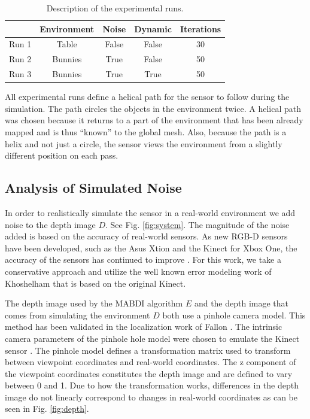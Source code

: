 \begin{table}[h]
  \caption{Description of the experimental runs.}
  \label{tab:run}
  \begin{footnotesize}
  \begin{center}
    \vspace{-10pt}
    \begin{tabular}{|l|c|c|c|c|}
    \hline
           & Environment & Noise   & Dynamic & Iterations \\\hline
    Run 1	 & Table       & False   & False   & 30 \\
    Run 2  & Bunnies     & True    & False   & 50 \\
    Run 3  & Bunnies     & True    & True    & 50 \\
    \hline
    \end{tabular}
  \end{center}
  \end{footnotesize}
\end{table}

All experimental runs define a helical path for the sensor to follow during the
simulation. The path circles the objects in the environment twice. A helical
path was chosen because it returns to a part of the environment that has been
already mapped and is thus ``known'' to the global mesh. Also, because the path
is a helix and not just a circle, the sensor views the environment from a
slightly different position on each pass.

\subsection{Analysis of Simulated Noise}

In order to realistically simulate the sensor in a real-world environment we add
noise to the depth image $D$. See Fig. \ref{fig:system}. The magnitude of the
noise added is based on the accuracy of real-world sensors. As new RGB-D sensors
have been developed, such as the Asus Xtion and the Kinect for Xbox One, the
accuracy of the sensors has continued to improve \cite{lachat2015first}. For
this work, we take a conservative approach and utilize the well known error
modeling work of Khoshelham \cite{Khoshelham2012} that is based on the original
Kinect.

The depth image used by the MABDI algorithm $E$ and the depth image that comes
from simulating the environment $D$ both use a pinhole camera model. This method
has been validated in the localization work of Fallon \cite{Fallon2012}. The
intrinsic camera parameters of the pinhole hole model were chosen to emulate the
Kinect sensor \cite{sitekinectspecs}. The pinhole model defines a transformation
matrix used to transform between viewpoint coordinates and real-world
coordinates. The z component of the viewpoint coordinates constitutes the depth
image and are defined to vary between 0 and 1. Due to how the transformation
works, differences in the depth image do not linearly correspond to changes in
real-world coordinates as can be seen in Fig. \ref{fig:depth}.

